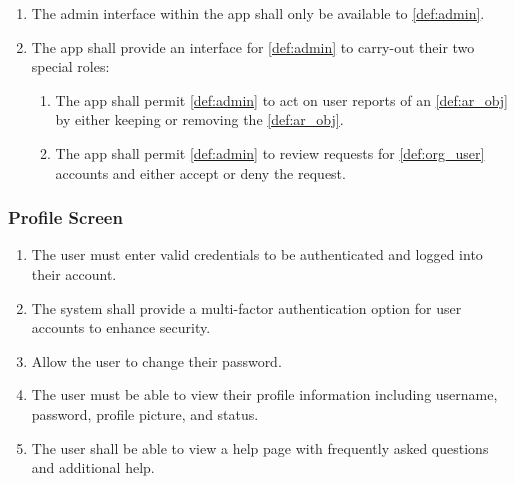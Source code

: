\documentclass{article}
\begin{document}
\begin{enumerate}[align=left, label=\textbf{AI-FR\arabic*:}]
    \item The admin interface within the app shall only be available to \ref{def:admin}.
    \item The app shall provide an interface for \ref{def:admin} to carry-out their two special roles:
          \begin{enumerate}[align=left, label=\textbf{AI-FR2.\arabic*:}]
              \item The app shall permit \ref{def:admin} to act on user reports of an \ref{def:ar_obj} by either keeping or removing the \ref{def:ar_obj}.
              \item The app shall permit \ref{def:admin} to review requests for \ref{def:org_user} accounts and either accept or deny the request.
          \end{enumerate}
\end{enumerate}

\subsubsection{Profile Screen}
\label{ssub:profile_screen}
\begin{enumerate}[align=left, label=\textbf{PS-FR\arabic*:}]
    \item The user must enter valid credentials to be authenticated and logged into their account.
    \item The system shall provide a multi-factor authentication option for user accounts to enhance security. \\
    \item Allow the user to change their password.
    \item The user must be able to view their profile information including username, password, profile picture, and status.
    \item The user shall be able to view a help page with frequently asked questions and additional help.
\end{enumerate}
\end{document}
